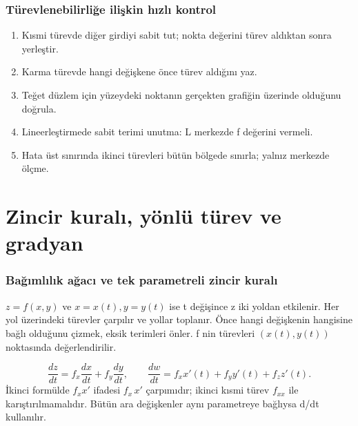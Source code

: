 \section{Türevlenebilirliğe ilişkin hızlı kontrol}
\begin{enumerate}
\item Kısmi türevde diğer girdiyi sabit tut; nokta değerini türev aldıktan sonra yerleştir.
\item Karma türevde hangi değişkene önce türev aldığını yaz.
\item Teğet düzlem için yüzeydeki noktanın gerçekten grafiğin üzerinde olduğunu doğrula.
\item Lineerleştirmede sabit terimi unutma: L merkezde f değerini vermeli.
\item Hata üst sınırında ikinci türevleri bütün bölgede sınırla; yalnız merkezde ölçme.
\end{enumerate}
\clearpage\part{Zincir kuralı, yönlü türev ve gradyan}
\section{Bağımlılık ağacı ve tek parametreli zincir kuralı}
\(z=f(x,y)\) ve \(x=x(t),y=y(t)\) ise t değişince z iki yoldan etkilenir. Her yol üzerindeki türevler çarpılır ve yollar toplanır. Önce hangi değişkenin hangisine bağlı olduğunu çizmek, eksik terimleri önler. f nin türevleri \((x(t),y(t))\) noktasında değerlendirilir.


{\small\[
\frac{dz}{dt}=f_x\frac{dx}{dt}+f_y\frac{dy}{dt},\qquad\frac{dw}{dt}=f_xx\prime(t)+f_yy\prime(t)+f_zz\prime(t).
\]}
İkinci formülde \(f_xx\prime\) ifadesi \(f_x\,x\prime\) çarpımıdır; ikinci kısmi türev \(f_{xx}\) ile karıştırılmamalıdır. Bütün ara değişkenler aynı parametreye bağlıysa d/dt kullanılır.

